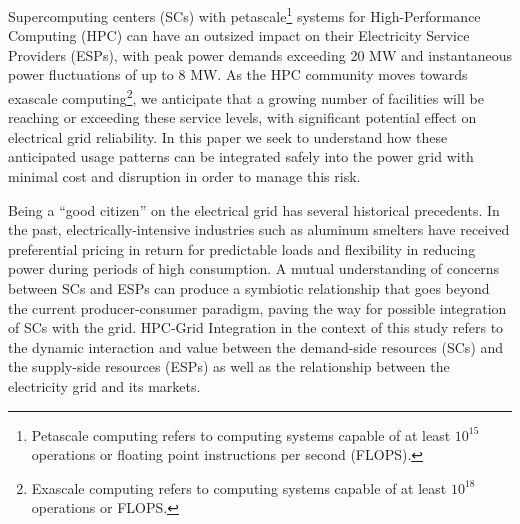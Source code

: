 
Supercomputing centers (SCs) with petascale\footnote{Petascale computing refers to computing systems capable of at
least \(10^{15}\) operations or floating point instructions per second (FLOPS).} 
systems for High-Performance Computing (HPC) can have an outsized 
impact on their Electricity Service Providers (ESPs), with peak 
power demands %
exceeding 20 MW and instantaneous power fluctuations of up to 8 MW. 
As the HPC community moves towards exascale computing\footnote{Exascale computing refers to computing systems capable of at
least \(10^{18}\) operations or FLOPS.}, we anticipate that a growing number of facilities will
be reaching or exceeding these service levels, with significant potential 
effect on electrical grid reliability.
In this paper we seek to understand how these anticipated
usage patterns can be integrated safely into the power grid with minimal cost 
and disruption in order to manage
this risk.

Being a ``good citizen'' on the electrical grid has several historical precedents.
In the past, electrically-intensive industries such as aluminum smelters 
have received preferential pricing in return for predictable loads and
flexibility in reducing power during periods of high consumption.
A mutual understanding of concerns between SCs and ESPs can 
produce a symbiotic relationship that goes beyond the current producer-consumer 
paradigm, paving the way for possible integration of %
SCs with the grid. HPC-Grid Integration in the context of this study refers to the dynamic interaction and value between the demand-side resources (SCs) and the supply-side resources (ESPs) as well as the relationship between the electricity grid and its markets.

